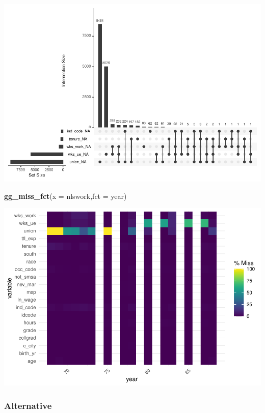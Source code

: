 \documentclass[
]{article}
\newenvironment{Shaded}{\begin{snugshade}}{\end{snugshade}}
\newcommand{\AttributeTok}[1]{\textcolor[rgb]{0.13,0.29,0.53}{#1}}
\newcommand{\FunctionTok}[1]{\textcolor[rgb]{0.13,0.29,0.53}{\textbf{#1}}}
\newcommand{\NormalTok}[1]{#1}
\begin{document}
\includegraphics{RIntro_files/figure-latex/unnamed-chunk-8-2.pdf}

\begin{Shaded}
\begin{Highlighting}[]
\FunctionTok{gg\_miss\_fct}\NormalTok{(}\AttributeTok{x =}\NormalTok{ nlswork,}\AttributeTok{fct =}\NormalTok{ year)}
\end{Highlighting}
\end{Shaded}

\includegraphics{RIntro_files/figure-latex/unnamed-chunk-9-1.pdf}

\hypertarget{alternative}{%
\subsubsection{Alternative}\label{alternative}}
\end{document}
